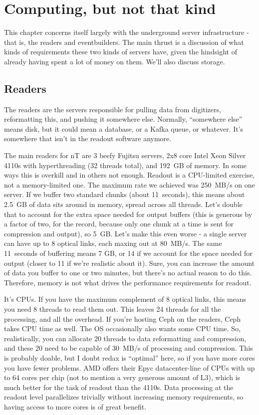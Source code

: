 
\chapter{Computing, but not that kind}

This chapter concerns itself largely with the underground server infrastructure - that is, the readers and eventbuilders.
The main thrust is a discussion of what kinds of requirements these two kinds of servers have, given the hindsight of already having spent a lot of money on them.
We'll also discuss storage.

\section{Readers}

The readers are the servers responsible for pulling data from digitizers, reformatting this, and pushing it somewhere else.
Normally, ``somewhere else'' means disk, but it could mean a database, or a Kafka queue, or whatever.
It's somewhere that isn't in the readout software anymore.

The main readers for nT are 3 beefy Fujitsu servers, 2x8 core Intel Xeon Silver 4110s with hyperthreading (32 threads total), and 192~GB of memory.
In some ways this is overkill and in others not enough.
Readout is a CPU-limited exercise, not a memory-limited one.
The maximum rate we achieved was 250~MB/s on one server.
If we buffer two standard chunks (about 11~seconds), this means about 2.5~GB of data sits around in memory, spread across all threads.
Let's double that to account for the extra space needed for output buffers (this is generous by a factor of two, for the record, because only one chunk at a time is sent for compression and output), so 5~GB.
Let's make this even worse - a single server can have up to 8 optical links, each maxing out at 80~MB/s.
The same 11~seconds of buffering means 7 GB, or 14 if we account for the space needed for output (closer to 11 if we're realistic about it).
Sure, you can increase the amount of data you buffer to one or two minutes, but there's no actual reason to do this.
Therefore, memory is not what drives the performance requirements for readout.

It's CPUs.
If you have the maximum complement of 8 optical links, this means you need 8 threads to read them out.
This leaves 24 threads for all the processing, and all the overhead.
If you're hosting Ceph on the readers, Ceph takes CPU time as well.
The OS occasionally also wants some CPU time.
So, realistically, you can allocate 20 threads to data reformatting and compression, and these 20 need to be capable of 30~MB/s of processing and compression.
This is probably doable, but I doubt redax is ``optimal'' here, so if you have more cores you have fewer problems.
AMD offers their Epyc datacenter-line of CPUs with up to 64 cores per chip (not to mention a very generous amount of L3), which is much better for the task of readout than the 4110s.
Data processing at the readout level parallelizes trivially without increasing memory requirements, so having access to more cores is of great benefit.

